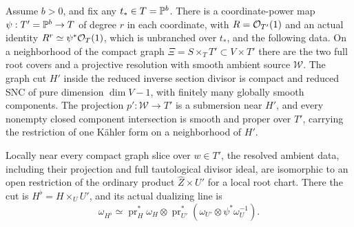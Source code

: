 \begin{proposition}\label{prop:global-graph}
Assume \(b>0\), and fix any \(t_*\in T=\mathbb P^b\).  There is a coordinate-power
map \(\psi:T'=\mathbb P^b\to T\) of degree \(r\) in each coordinate, with
\(R=\mathcal O_{T'}(1)\) and an actual identity \(R^r\simeq\psi^*\mathcal O_T(1)\),
which is unbranched over \(t_*\), and the following data.  On a neighborhood
of the compact graph \(\Xi=S\times_T T'\subset V\times T'\) there are
the two full root covers and a projective resolution with smooth ambient
source \(\mathscr W\).  The graph cut \(H'\) inside the reduced inverse
section divisor is compact and reduced SNC of pure dimension \(\dim V-1\),
with finitely many globally smooth components.  The projection
\(p':\mathscr W\to T'\) is a submersion near \(H'\), and every nonempty
closed component intersection is smooth and proper over \(T'\), carrying
the restriction of one K\"ahler form on a neighborhood of \(H'\).

Locally near every compact graph slice over \(w\in T'\), the resolved
ambient data, including their projection and full tautological divisor
ideal, are isomorphic to an open restriction of the ordinary product
\(\widehat Z\times U'\) for a local root chart.  There the cut is
\(H^\flat=H\times_U U'\), and its actual dualizing line is
\begin{equation}\label{eq:graph-adjunction}
 \omega_{H^\flat}\simeq\operatorname{pr}_H^*\omega_H\otimes
 \operatorname{pr}_{U'}^*(\omega_{U'}\otimes\psi^*\omega_U^{-1}).
\end{equation}
\end{proposition}
